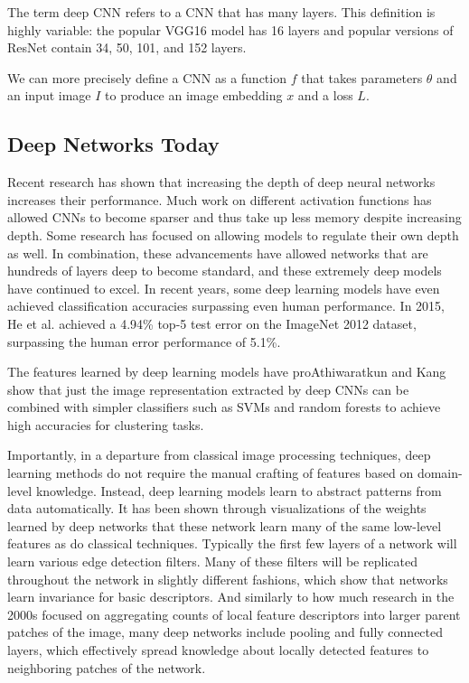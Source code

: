 The term deep CNN refers to a CNN that has many layers. This definition is highly variable: the popular VGG16 model has 16 layers\cite{simonyan2014very} and popular versions of ResNet contain 34, 50, 101, and 152 layers\cite{he2016deep}.

We can more precisely define a CNN as a function $f$ that takes parameters $\theta$ and an input image $I$ to produce an image embedding $x$ and a loss $L$.

\subsection{Deep Networks Today}
Recent research has shown that increasing the depth of deep neural networks increases their performance.\cite{szegedy2015going} Much work on different activation functions has allowed CNNs to become sparser and thus take up less memory despite increasing depth.\cite{simonyan2014very}\cite{szegedy2015going} Some research has focused on allowing models to regulate their own depth as well.\cite{he2016deep} In combination, these advancements have allowed networks that are hundreds of layers deep to become standard, and these extremely deep models have continued to excel.  In recent years, some deep learning models have even achieved classification accuracies surpassing even human performance. In 2015, He et al. achieved a 4.94\% top-5 test error on the ImageNet 2012 dataset, surpassing the human error performance of 5.1\%\cite{he2016deep}. 

The features learned by deep learning models have proAthiwaratkun and Kang show that just the image representation extracted by deep CNNs can be combined with simpler classifiers such as SVMs and random forests to achieve high accuracies for clustering tasks.\cite{athiwaratkun2015feature}

Importantly, in a departure from classical image processing techniques, deep learning methods do not require the manual crafting of features based on domain-level knowledge. Instead, deep learning models learn to abstract patterns from data automatically. It has been shown through visualizations of the weights learned by deep networks that these network learn many of the same low-level features as do classical techniques. Typically the first few layers of a network will learn various edge detection filters. Many of these filters will be replicated throughout the network in slightly different fashions, which show that networks learn invariance for basic descriptors. And similarly to how much research in the 2000s focused on aggregating counts of local feature descriptors into larger parent patches of the image, many deep networks include pooling and fully connected layers, which effectively spread knowledge about locally detected features to neighboring patches of the network. 


